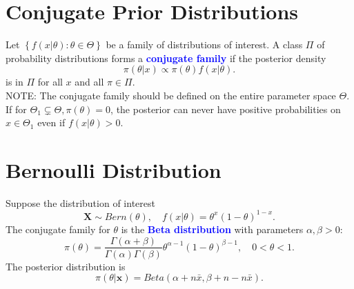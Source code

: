\section{Conjugate Prior Distributions}
Let $\left\{ f\left( x|\theta \right) : \theta\in \Theta \right\} $ be a family
of distributions of interest. A class $\Pi$ of probability distributions
forms a \textcolor{Blue}{\textbf{conjugate family}} if the posterior density
\[\pi\left( \theta|x \right) \propto \pi\left( \theta \right) f\left( x|\theta
\right) .\]
is in $\Pi$ for all $x$ and all $\pi \in \Pi$.\\

\textcolor{Bittersweet}{NOTE:} The conjugate family should be defined on the
entire parameter space $\Theta$. If for $\Theta_1\subsetneq \Theta, \pi \left(
\theta \right) =0$, the posterior can \textcolor{Bittersweet}{never} have
positive probabilities on $x\in \Theta_1$ even if $f\left( x|\theta \right)
>0$.

\section{Bernoulli Distribution}
Suppose the distribution of interest
\[\mathbf{X}\sim Bern\left( \theta \right),\quad f\left( x|\theta \right) =\theta^{x}{\left( 1-\theta \right) }^{1-x}.\]
The conjugate family for $\theta$ is the \textcolor{Blue}{\textbf{Beta distribution}} with parameters $\alpha, \beta >0$:
\[\pi\left( \theta \right) =\frac{\Gamma \left(\alpha +\beta \right) }{\Gamma \left( \alpha \right) \Gamma \left( \beta \right) }\theta^{\alpha -1}{\left(1-\theta \right) }^{\beta -1},\quad 0<\theta<1.\]
The posterior distribution is
\[\pi\left( \theta|\mathbf{x} \right) =Beta\left(
\alpha +n \bar{x},\beta +n-n \bar{x} \right).\]


